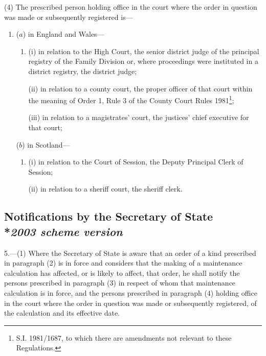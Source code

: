 \documentclass[12pt,a4paper]{article}
\begin{document}
(4) The prescribed person holding office in the court where the order in question was made or subsequently registered is—
\begin{enumerate}\item[]
($a$) in England and Wales—
\begin{enumerate}\item[]
(i) in relation to the High Court, the senior district judge of the principal registry of the Family Division or, where proceedings were instituted in a district registry, the district judge;

(ii) in relation to a county court, the proper officer of that court within the meaning of Order 1, Rule 3 of the County Court Rules 1981\footnote{\frenchspacing S.I. 1981/1687, to which there are amendments not relevant to these Regulations.};

(iii) in relation to a magistrates' court, the 
justices' chief executive for  %
that court;
\end{enumerate}

($b$) in Scotland—
\begin{enumerate}\item[]
(i) in relation to the Court of Session, the Deputy Principal Clerk of Session;

(ii) in relation to a sheriff court, the sheriff clerk.
\end{enumerate}
\end{enumerate}


\subsection[5. Notifications by the Secretary of State --- \emph{2003 scheme version}]{Notifications by the Secretary of State\\*\emph{2003 scheme version}}

5.—(1) Where 
the Secretary of State  %
is aware that an order of a kind prescribed in paragraph (2) is in force and considers that the making of a maintenance 
calculation
has affected, or is likely to affect, that order, he shall notify the persons prescribed in paragraph (3) in respect of whom that maintenance 
calculation 
is in force, and the persons prescribed in paragraph (4) holding office in the court where the order in question was made or subsequently registered, of the 
calculation
and its effective date.
\end{document}
